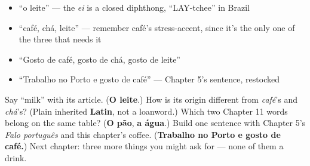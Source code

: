 \begin{itemize}
\raggedright
  \item \textquotedblleft{}o leite\textquotedblright{} — the \emph{ei} is a closed diphthong, \textquotedblleft{}LAY-tchee\textquotedblright{} in Brazil
  \item \textquotedblleft{}café, chá, leite\textquotedblright{} — remember café's stress-accent, since it's the only one of the three that needs it
  \item \textquotedblleft{}Gosto de café, gosto de chá, gosto de leite\textquotedblright{}
  \item \textquotedblleft{}Trabalho no Porto e gosto de café\textquotedblright{} — Chapter 5's sentence, restocked
\end{itemize}

\begin{tcolorbox}[breakable,colback=teal!4,colframe=teal!35!black,title={Before you move on}]
Say \textquotedblleft{}milk\textquotedblright{} with its article. (\textbf{O leite}.) How is its origin different from \emph{café}'s and \emph{chá}'s? (Plain inherited \textbf{Latin}, not a loanword.) Which two Chapter 11 words belong on the same table? (\textbf{O pão}, \textbf{a água}.) Build one sentence with Chapter 5's \emph{Falo português} and this chapter's coffee. (\textbf{Trabalho no Porto e gosto de café.}) Next chapter: three more things you might ask for — none of them a drink.
\end{tcolorbox}
